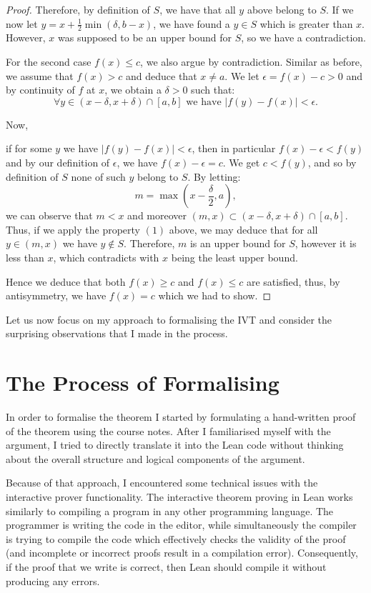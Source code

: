 \documentclass[11pt]{article}
\newcommand\weh{\text{ we have }}
\begin{document}
\begin{proof}
Therefore, by definition of $S$, we have that all $y$ above belong to $S$.
If we now let $y = x + \frac{1}{2} \min(\delta, b - x)$, we have found
a $y \in S$ which is greater than $x$. However,  $x$ was supposed
to be an upper bound for  $S$, so we have a contradiction.

For the second case $f(x) \le c$, we also argue by contradiction. Similar as
before, we assume that $f(x) > c$ and deduce that  $x \ne a$.
We let  $\epsilon = f(x) - c > 0$ and by continuity of $f$ at $x$, we obtain a
$\delta > 0$ such that:
\begin{equation}
  \forall y \in (x - \delta, x + \delta) \cap [a, b] \weh |f(y) - f(x)| < \epsilon
.\end{equation}

\hypertarget{upper_bound}{Now,} if for some $y$ we have  $|f(y) - f(x)| < \epsilon$, then
in particular $f(x) - \epsilon < f(y) $ and by our definition of  $\epsilon$,
we have $f(x) - \epsilon = c $. We get  $c < f(y)$, and so by definition of $S$ none of such
$y$ belong to $S$. By letting:
\[
m = \max \left(x - \frac{\delta}{2}, a\right)
,\]
we can observe that $m < x$ and moreover $(m, x) \subset (x - \delta, x + \delta) \cap [a, b]$.
Thus, if we apply the property $(1)$ above, we may deduce that for all $y \in (m, x)$
we have  $y \not\in S$. Therefore, $m$ is an upper bound for $S$, however it is
less than $x$, which contradicts with  $x$ being the least upper bound.

Hence we deduce that both $f(x) \ge c$ and  $f(x) \le c$ are satisfied, thus,
by antisymmetry, we have $f(x) = c$ which we had to show.
\end{proof}

Let us now focus on my approach to formalising the IVT and consider the surprising
observations that I made in the process.
\section*{ The Process of Formalising }
In order to formalise the theorem I started by formulating a hand-written proof
of the theorem using the course notes. After I familiarised myself with the
argument, I tried to directly translate it into the Lean code without thinking
about the overall structure and logical components of the argument.

Because of that approach, I encountered some technical issues with the
interactive prover functionality. The interactive theorem proving in Lean works
similarly to compiling a program in any other programming language. The
programmer is writing the code in the editor, while simultaneously the compiler
is trying to compile the code which effectively
checks the validity of the proof (and incomplete or incorrect proofs result in
a compilation error). Consequently, if the proof that we write is correct, then
Lean should compile it without producing any errors.
\end{document}
